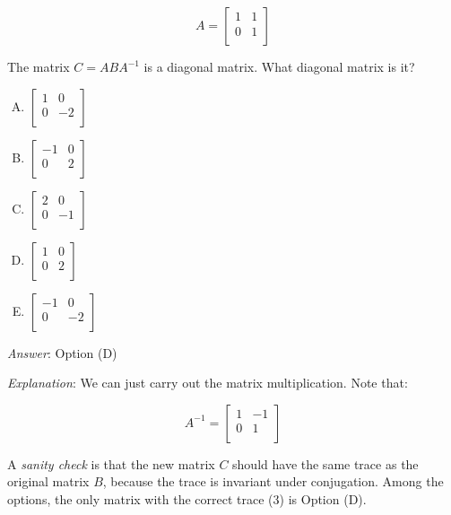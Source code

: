 \documentclass[10pt]{amsart}
\begin{document}
\begin{enumerate}
  $$A = \left[ \begin{matrix} 1 & 1 \\ 0 & 1 \\\end{matrix}\right]$$

  The matrix $C = ABA^{-1}$ is a diagonal matrix. What diagonal matrix
  is it?

  \begin{enumerate}[(A)]
  \item $\left[\begin{matrix} 1 & 0 \\ 0 & -2 \\\end{matrix}\right]$
  \item $\left[\begin{matrix} -1 & 0 \\ 0 & 2 \\\end{matrix}\right]$
  \item $\left[\begin{matrix} 2 & 0 \\ 0 & -1 \\\end{matrix}\right]$
  \item $\left[\begin{matrix} 1 & 0 \\ 0 & 2 \\\end{matrix}\right]$
  \item $\left[\begin{matrix} -1 & 0 \\ 0 & -2 \\\end{matrix}\right]$
  \end{enumerate}

  {\em Answer}: Option (D)

  {\em Explanation}: We can just carry out the matrix
  multiplication. Note that:

  $$A^{-1} = \left[\begin{matrix} 1 & -1 \\ 0 & 1 \\\end{matrix}\right]$$

  A {\em sanity check} is that the new matrix $C$ should have the same
  trace as the original matrix $B$, because the trace is invariant
  under conjugation. Among the options, the only matrix with the
  correct trace ($3$) is Option (D).


\end{enumerate}
\end{document}

